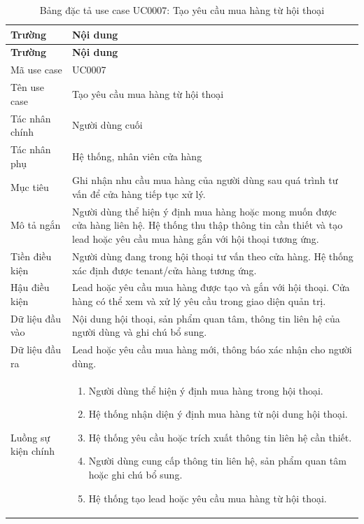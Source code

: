 \documentclass[../DoAn.tex]{subfiles}
\begin{document}
\begin{longtable}{|p{}|p{}|}
\caption{Bảng đặc tả use case UC0007: Tạo yêu cầu mua hàng từ hội thoại}
\label{table:UC0007} \\
\hline
\textbf{Trường} & \textbf{Nội dung} \\
\hline
\endfirsthead

\hline
\textbf{Trường} & \textbf{Nội dung} \\
\hline
\endhead

Mã use case & UC0007 \\
\hline
Tên use case & Tạo yêu cầu mua hàng từ hội thoại \\
\hline
Tác nhân chính & Người dùng cuối \\
\hline
Tác nhân phụ & Hệ thống, nhân viên cửa hàng \\
\hline
Mục tiêu & Ghi nhận nhu cầu mua hàng của người dùng sau quá trình tư vấn để cửa hàng tiếp tục xử lý. \\
\hline
Mô tả ngắn & Người dùng thể hiện ý định mua hàng hoặc mong muốn được cửa hàng liên hệ. Hệ thống thu thập thông tin cần thiết và tạo lead hoặc yêu cầu mua hàng gắn với hội thoại tương ứng. \\
\hline
Tiền điều kiện & Người dùng đang trong hội thoại tư vấn theo cửa hàng. Hệ thống xác định được tenant/cửa hàng tương ứng. \\
\hline
Hậu điều kiện & Lead hoặc yêu cầu mua hàng được tạo và gắn với hội thoại. Cửa hàng có thể xem và xử lý yêu cầu trong giao diện quản trị. \\
\hline
Dữ liệu đầu vào & Nội dung hội thoại, sản phẩm quan tâm, thông tin liên hệ của người dùng và ghi chú bổ sung. \\
\hline
Dữ liệu đầu ra & Lead hoặc yêu cầu mua hàng mới, thông báo xác nhận cho người dùng. \\
\hline
Luồng sự kiện chính &
\begin{minipage}[t]{0.68\textwidth}
\begin{enumerate}
    \item Người dùng thể hiện ý định mua hàng trong hội thoại.
    \item Hệ thống nhận diện ý định mua hàng từ nội dung hội thoại.
    \item Hệ thống yêu cầu hoặc trích xuất thông tin liên hệ cần thiết.
    \item Người dùng cung cấp thông tin liên hệ, sản phẩm quan tâm hoặc ghi chú bổ sung.
    \item Hệ thống tạo lead hoặc yêu cầu mua hàng từ hội thoại.

\end{enumerate}
\end{minipage}
\end{longtable}
\end{document}
